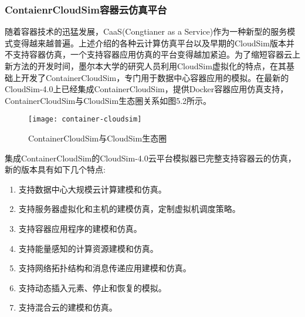 \subsubsection{ContaienrCloudSim容器云仿真平台}
随着容器技术的迅猛发展，CaaS(Congtianer as a Service)作为一种新型的服务模式变得越来越普遍。上述介绍的各种云计算仿真平台以及早期的CloudSim版本并不支持容器仿真，一个支持容器应用仿真的平台变得越加紧迫。为了缩短容器云上新方法的开发时间，墨尔本大学的研究人员利用CloudSim虚拟化的特点，在其基础上开发了ContainerCloudSim，专门用于数据中心容器应用的模拟。在最新的CloudSim-4.0上已经集成ContainerCloudSim，提供Docker容器应用仿真支持，ContainerCloudSim与CloudSim生态圈关系如图5.2所示。
\begin{figure}[H] %
	\centering
	\texttt{[image: container-cloudsim]}
	\caption{ContainerCloudSim与CloudSim生态圈}
\end{figure}
集成ContainerCloudSim的CloudSim-4.0云平台模拟器已完整支持容器云的仿真，新的版本具有如下几个特点:
\begin{enumerate}[(1)]
	\item 支持数据中心大规模云计算建模和仿真。
	\item 支持服务器虚拟化和主机的建模仿真，定制虚拟机调度策略。
	\item 支持容器应用程序的建模和仿真。
	\item 支持能量感知的计算资源建模和仿真。
	\item 支持网络拓扑结构和消息传递应用建模和仿真。
	\item 支持动态插入元素、停止和恢复的模拟。
	\item 支持混合云的建模和仿真。
\end{enumerate}

